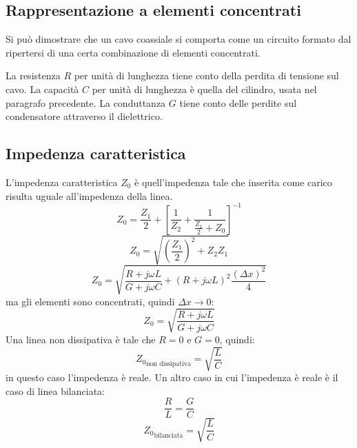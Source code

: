 \subsection{Rappresentazione a elementi concentrati}
Si può dimostrare che un cavo coassiale si comporta come un circuito formato dal ripertersi di una certa combinazione di elementi concentrati.

La resistenza $R$ per unità di lunghezza tiene conto della perdita di tensione sul cavo. La capacità $C$ per unità di lunghezza è quella del cilindro, usata nel paragrafo precedente. La conduttanza $G$ tiene conto delle perdite sul condensatore attraverso il dielettrico.
\subsection{Impedenza caratteristica}
L'impedenza caratteristica $Z_0$ è quell'impedenza tale che inserita come carico risulta uguale all'impedenza della linea.
\begin{equation}
Z_0=\frac{Z_1}{2}+\left[\frac{1}{Z_2}+\frac{1}{\frac{Z_1}{2}+Z_0}\right]^{-1}
\end{equation}
\begin{equation}
Z_0=\sqrt{\left(\frac{Z_1}{2}\right)^2+Z_2Z_1}
\end{equation}
\begin{equation}
Z_0=\sqrt{\frac{R+j\omega L}{G+j\omega C}+\left(R+j\omega L\right)^2\frac{(\Delta x)^2}{4}}
\end{equation}
ma gli elementi sono concentrati, quindi $\Delta x\to 0$:
\begin{equation}
Z_0=\sqrt{\frac{R+j\omega L}{G+j\omega C}}
\end{equation}
Una linea non dissipativa è tale che $R=0$ e $G=0$, quindi:
\begin{equation}
{Z_0}_\text{non dissipativa}=\sqrt{\frac{L}{C}}
\end{equation}
in questo caso l'impedenza è reale. Un altro caso in cui l'impedenza è reale è il caso di linea bilanciata:
\begin{equation}
\frac{R}{L}=\frac{G}{C}
\end{equation}
\begin{equation}
{Z_0}_\text{bilanciata}=\sqrt{\frac{L}{C}}
\end{equation}













